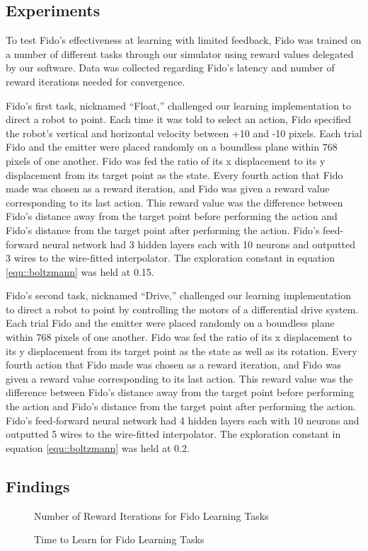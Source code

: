 \subsection{Experiments}

To test Fido's effectiveness at learning with limited feedback, Fido was trained on a number of different tasks through our simulator using reward values delegated by our software. Data was collected regarding Fido's latency and number of reward iterations needed for convergence.

Fido's first task, nicknamed ``Float,'' challenged our learning implementation to direct a robot to point. Each time it was told to select an action, Fido specified the robot's vertical and horizontal velocity between +10 and -10 pixels. Each trial Fido and the emitter were placed randomly on a boundless plane within 768 pixels of one another. Fido was fed the ratio of its x displacement to its y displacement from its target point as the state. Every fourth action that Fido made was chosen as a reward iteration, and Fido was given a reward value corresponding to its last action. This reward value was the difference between Fido's distance away from the target point before performing the action and Fido's distance from the target point after performing the action. Fido's feed-forward neural network had 3 hidden layers each with 10 neurons and outputted 3 wires to the wire-fitted interpolator. The exploration constant in equation \ref{equ::boltzmann} was held at 0.15.

Fido's second task, nicknamed ``Drive,'' challenged our learning implementation to direct a robot to point by controlling the motors of a differential drive system. Each trial Fido and the emitter were placed randomly on a boundless plane within 768 pixels of one another. Fido was fed the ratio of its x displacement to its y displacement from its target point as the state as well as its rotation. Every fourth action that Fido made was chosen as a reward iteration, and Fido was given a reward value corresponding to its last action. This reward value was the difference between Fido's distance away from the target point before performing the action and Fido's distance from the target point after performing the action. Fido's feed-forward neural network had 4 hidden layers each with 10 neurons and outputted 5 wires to the wire-fitted interpolator. The exploration constant in equation \ref{equ::boltzmann} was held at 0.2.


\subsection{Findings}

\begin{figure}[ht]
	\centering
	
	\caption{Number of Reward Iterations for Fido Learning Tasks}
\end{figure}

\begin{figure}[ht]
	\centering
	
	\caption{Time to Learn for Fido Learning Tasks}
\end{figure}
